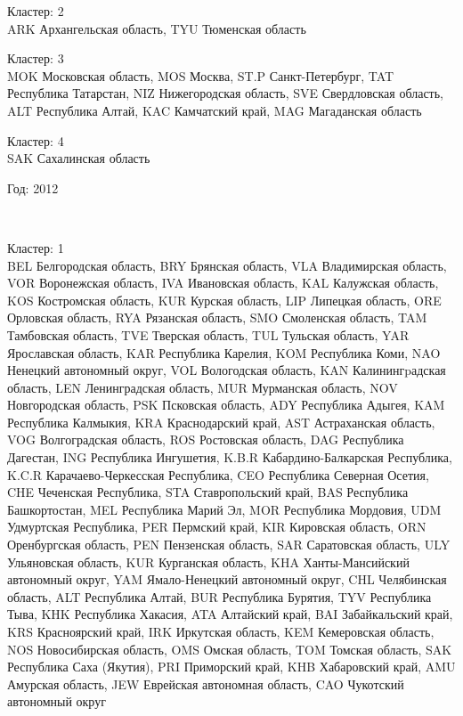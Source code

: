 \documentclass[11pt]{article}
\begin{document}
Кластер:  2 \\
ARK Архангельская область, TYU Тюменская область

Кластер:  3 \\
MOK Московская область, MOS Москва, ST.P Санкт-Петербург, TAT Республика Татарстан, NIZ Нижегородская область, SVE Свердловская область, ALT Республика Алтай, KAC Камчатский край, MAG Магаданская область

Кластер:  4 \\
SAK Сахалинская область

\begin{center}
Год:  2012
\end{center}


    \begin{center}
    \end{center}
    { \hspace*{\fill} \\}
    
Кластер:  1 \\
BEL Белгородская область, BRY Брянская область, VLA Владимирская область, VOR Воронежская область, IVA Ивановская область, KAL Калужская область, KOS Костромская область, KUR Курская область, LIP Липецкая область, ORE Орловская область, RYA Рязанская область, SMO Смоленская область, TAM Тамбовская область, TVE Тверская область, TUL Тульская область, YAR Ярославская область, KAR Республика Карелия, KOM Республика Коми, NAO Ненецкий автономный округ, VOL Вологодская область, KAN Калинингpадская область, LEN Ленинградская область, MUR Мурманская область, NOV Новгородская область, PSK Псковская область, ADY Республика Адыгея, KAM Республика Калмыкия, KRA Краснодарский край, AST Астраханская область, VOG Волгоградская область, ROS Ростовская область, DAG Республика Дагестан, ING Республика Ингушетия, K.B.R Кабардино-Балкарская Республика, K.C.R Карачаево-Черкесская Республика, CEO Республика Северная Осетия, CHE Чеченская Республика, STA Ставропольский край, BAS Республика Башкортостан, MEL Республика Марий Эл, MOR Республика Мордовия, UDM Удмуртская Республика, PER Пермский край, KIR Кировская область, ORN Оренбургская область, PEN Пензенская область, SAR Саратовская область, ULY Ульяновская область, KUR Курганская область, KHA Ханты-Мансийский автономный округ, YAM Ямало-Ненецкий автономный округ, CHL Челябинская область, ALT Республика Алтай, BUR Республика Бурятия, TYV Республика Тыва, KHK Республика Хакасия, ATA Алтайский край, BAI Забайкальский край, KRS Красноярский край, IRK Иркутская область, KEM Кемеровская область, NOS Новосибирская область, OMS Омская область, TOM Томская область, SAK Республика Саха (Якутия), PRI Приморский край, KHB Хабаровский край, AMU Амурская область, JEW Еврейская автономная область, CAO Чукотский автономный округ
\end{document}
